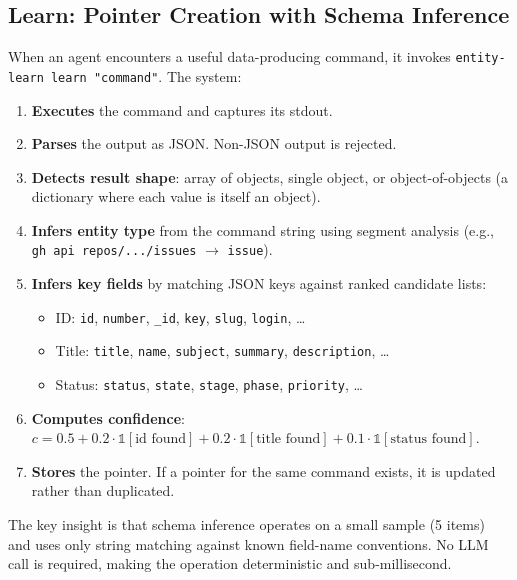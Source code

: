 \documentclass[11pt,twocolumn]{article}
\begin{document}
\subsection{Learn: Pointer Creation with Schema Inference}
\label{sec:learn}

When an agent encounters a useful data-producing command, it invokes \texttt{entity-learn learn "command"}.
The system:

\begin{enumerate}[leftmargin=1.5em,itemsep=2pt]
  \item \textbf{Executes} the command and captures its stdout.
  \item \textbf{Parses} the output as JSON. Non-JSON output is rejected.
  \item \textbf{Detects result shape}: array of objects, single object, or object-of-objects (a dictionary where each value is itself an object).
  \item \textbf{Infers entity type} from the command string using segment analysis (e.g., \texttt{gh api repos/.../issues} $\rightarrow$ \texttt{issue}).
  \item \textbf{Infers key fields} by matching JSON keys against ranked candidate lists:
    \begin{itemize}[leftmargin=1em,itemsep=0pt]
      \item ID: \texttt{id}, \texttt{number}, \texttt{\_id}, \texttt{key}, \texttt{slug}, \texttt{login}, \ldots
      \item Title: \texttt{title}, \texttt{name}, \texttt{subject}, \texttt{summary}, \texttt{description}, \ldots
      \item Status: \texttt{status}, \texttt{state}, \texttt{stage}, \texttt{phase}, \texttt{priority}, \ldots
    \end{itemize}
  \item \textbf{Computes confidence}: $c = 0.5 + 0.2 \cdot \mathbb{1}[\text{id found}] + 0.2 \cdot \mathbb{1}[\text{title found}] + 0.1 \cdot \mathbb{1}[\text{status found}]$.
  \item \textbf{Stores} the pointer. If a pointer for the same command exists, it is updated rather than duplicated.
\end{enumerate}

The key insight is that schema inference operates on a small sample (5 items) and uses only string matching against known field-name conventions.
No LLM call is required, making the operation deterministic and sub-millisecond.
\end{document}
